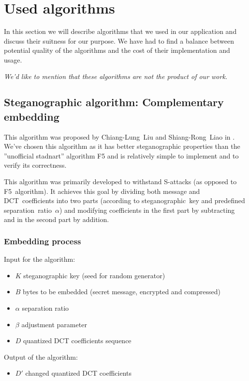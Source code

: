 \section{Used algorithms}
In this section we will describe algorithms that we used in our application
and discuss their suitness for our purpose. 
We have had to find a balance between potential quality of the algorithms 
and the cost of their implementation and usage.

\textit{We'd like to mention that these algorithms are not the product of our work.}

\subsection{Steganographic algorithm: Complementary embedding}

This algorithm was proposed by Chiang-Lung~Liu and Shiang-Rong~Liao in \cite{liu2008high}.
We've chosen this algorithm as it has better steganographic properties than the ''unofficial
stadnart'' algorithm F5 and is relatively simple to implement and to verify its correctness.

This algorithm was primarily developed to withstand S-attacks (as opposed to F5~algorithm).
It achieves this goal by dividing both message and DCT~coefficients into two parts
(according to steganographic~key and predefined separation~ratio~$\alpha$) and
modifying coefficients in the first part by subtracting and in the second part by addition.

\subsubsection{Embedding process}
Input for the algorithm:

\begin{itemize}
    \item $K$ steganographic key (seed for random generator)
    \item $B$ bytes to be embedded (secret message, encrypted and compressed)
    \item $\alpha$ separation ratio
    \item $\beta$ adjustment parameter
    \item $D$ quantized DCT coefficients sequence
\end{itemize}

Output of the algorithm:

\begin{itemize}
    \item $D'$ changed quantized DCT coefficients
\end{itemize}


